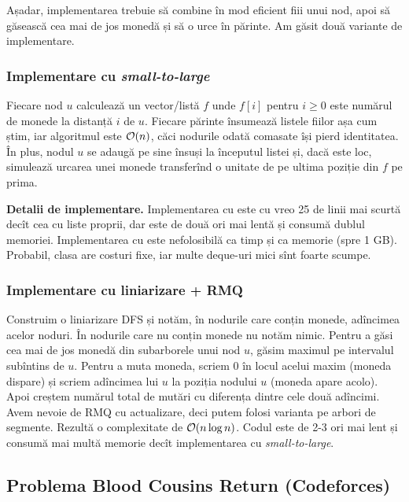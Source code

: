 \documentclass[../main.tex]{subfiles}
\begin{document}
Așadar, implementarea trebuie să combine în mod eficient fiii unui nod, apoi să găsească cea mai de jos monedă și să o urce în părinte. Am găsit două variante de implementare.

\subsubsection*{Implementare cu \textit{small-to-large}}

Fiecare nod $u$ calculează un vector/listă $f$ unde $f[i]$ pentru $i \geq 0$ este numărul de monede la distanță $i$ de $u$. Fiecare părinte însumează listele fiilor așa cum știm, iar algoritmul este $\mathcal{O}(n)$, căci nodurile odată comasate își pierd identitatea. În plus, nodul $u$ se adaugă pe sine însuși la începutul listei și, dacă este loc, simulează urcarea unei monede transferînd o unitate de pe ultima poziție din $f$ pe prima.

\textbf{Detalii de implementare.} Implementarea cu  este cu vreo 25 de linii mai scurtă decît cea cu liste proprii, dar este de două ori mai lentă și consumă dublul memoriei. Implementarea cu  este nefolosibilă ca timp și ca memorie (spre 1 GB). Probabil, clasa  are costuri fixe, iar multe deque-uri mici sînt foarte scumpe.

\subsubsection*{Implementare cu liniarizare + RMQ}

Construim o liniarizare DFS și notăm, în nodurile care conțin monede, adîncimea acelor noduri. În nodurile care nu conțin monede nu notăm nimic. Pentru a găsi cea mai de jos monedă din subarborele unui nod $u$, găsim maximul pe intervalul subîntins de $u$. Pentru a muta moneda, scriem 0 în locul acelui maxim (moneda dispare) și scriem adîncimea lui $u$ la poziția nodului $u$ (moneda apare acolo). Apoi creștem numărul total de mutări cu diferența dintre cele două adîncimi. Avem nevoie de RMQ cu actualizare, deci putem folosi varianta pe arbori de segmente. Rezultă o complexitate de $\mathcal{O}(n \log n)$. Codul este de 2-3 ori mai lent și consumă mai multă memorie decît implementarea cu \textit{small-to-large}.

\subsection{Problema Blood Cousins Return (Codeforces)}
\label{problem:blood-cousins-return}
\end{document}
